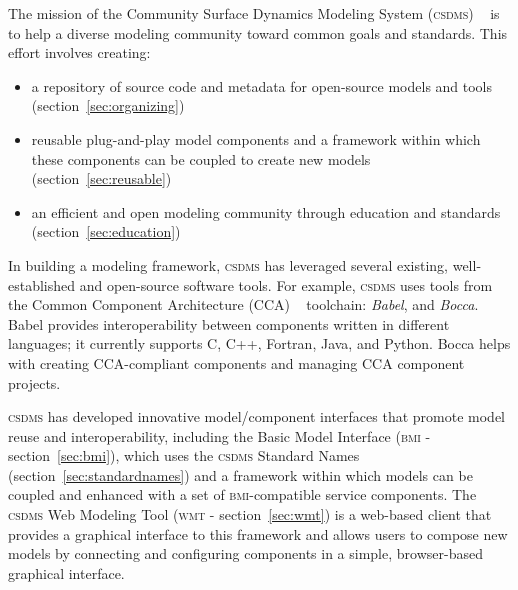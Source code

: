 \documentclass[11pt, oneside]{amsart}
\DeclareRobustCommand{\csdms}{\textsc{csdms}}
\DeclareRobustCommand{\bmi}{\textsc{bmi}}
\DeclareRobustCommand{\wmt}{\textsc{wmt}}
\begin{document}
The mission of the Community Surface Dynamics Modeling System (\csdms{})
~\cite{peckham2012component} is to help a diverse modeling community toward
common goals and standards.
This effort involves creating:
\begin{itemize}
  \item a repository of source code and metadata for open-source models and
    tools (section~\ref{sec:organizing})
  \item reusable plug-and-play model components and a framework
        within which these components can be coupled to create new models
        (section~\ref{sec:reusable})
  \item an efficient and open modeling community through education and
        standards (section~\ref{sec:education})
\end{itemize}


In building a modeling framework, \csdms{} has leveraged
several existing, well-established and open-source software tools. For example,
\csdms{} uses tools from the Common Component Architecture (CCA)
~\cite{armstrong1999toward} toolchain: \emph{Babel}, and \emph{Bocca}. Babel
provides interoperability between components
written in different languages; it currently supports C, C++, Fortran, Java,
and Python. Bocca helps with creating CCA-compliant components and managing CCA
component projects.

\csdms{} has developed innovative model/component interfaces that promote
model reuse and interoperability,
including the Basic Model Interface (\bmi{} - section~\ref{sec:bmi}), which
uses
the \csdms{} Standard Names (section~\ref{sec:standardnames}) and a framework
within which models can be coupled and enhanced with a set of \bmi{}-compatible
service components.
The \csdms{} Web Modeling Tool (\wmt{} - section~\ref{sec:wmt}) is a web-based client that provides a
graphical interface to this framework and allows users to compose new models
by connecting and configuring components in a simple, browser-based graphical
interface.
\end{document}
